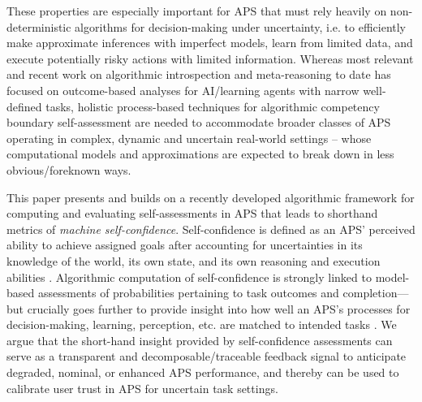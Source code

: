 These properties are especially important for APS that must rely heavily on non-deterministic algorithms for decision-making under uncertainty, i.e. to efficiently make approximate inferences with imperfect models, learn from limited data, and execute potentially risky actions with limited information. 
Whereas most relevant and recent work on algorithmic introspection and meta-reasoning to date has focused on outcome-based analyses for  AI/learning agents with narrow well-defined tasks,
holistic process-based techniques for algorithmic competency boundary self-assessment are needed to accommodate broader classes of APS operating in complex, dynamic and uncertain real-world settings -- whose computational models and approximations are expected to break down in less obvious/foreknown ways. %

This paper presents and builds on a recently developed algorithmic framework for computing and evaluating self-assessments in APS that leads to shorthand metrics of \emph{machine self-confidence}. Self-confidence is defined as an APS' perceived ability to achieve assigned goals after accounting for uncertainties in its knowledge of the world, its own state, and its own reasoning and execution abilities \cite{Aitken2016-cv, Aitken2016-fb, Sweet2016-tz}. 
Algorithmic computation of self-confidence is strongly linked to model-based assessments of probabilities pertaining to task outcomes and completion---but crucially goes further to provide insight into how well an APS's processes for decision-making, learning, perception, etc. are matched to intended tasks \cite{Hutchins2015-if}. 
We argue that the short-hand insight provided by self-confidence assessments can serve as a transparent and decomposable/traceable feedback signal to anticipate degraded, nominal, or enhanced APS performance, %
and thereby can be used to calibrate user trust in APS for uncertain task settings. 

